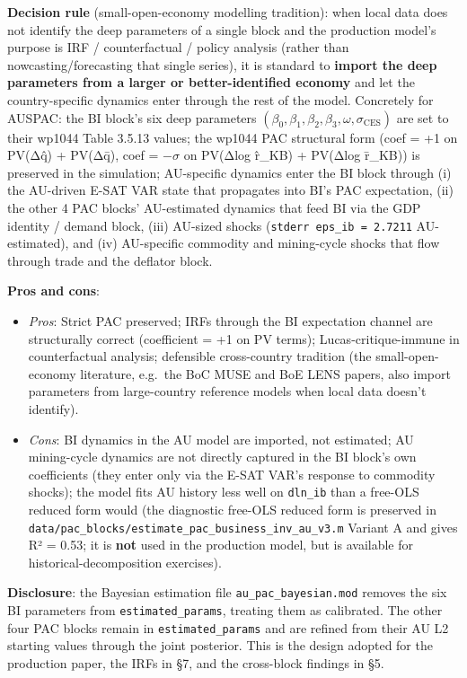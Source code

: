 \documentclass[
]{article}
\providecommand{\tightlist}{%
  \setlength{\itemsep}{0pt}\setlength{\parskip}{0pt}}
\begin{document}
\textbf{Decision rule} (small-open-economy modelling tradition): when
local data does not identify the deep parameters of a single block and
the production model's purpose is IRF / counterfactual / policy analysis
(rather than nowcasting/forecasting that single series), it is standard
to \textbf{import the deep parameters from a larger or better-identified
economy} and let the country-specific dynamics enter through the rest of
the model. Concretely for AUSPAC: the BI block's six deep parameters
\((\beta_0, \beta_1, \beta_2, \beta_3, \omega, \sigma_{\mathrm{CES}})\)
are set to their wp1044 Table 3.5.13 values; the wp1044 PAC structural
form (coef = +1 on PV(Δq̂) + PV(Δq̄), coef = \(-\sigma\) on PV(Δlog r̂\_KB)
+ PV(Δlog r̄\_KB)) is preserved in the simulation; AU-specific dynamics
enter the BI block through (i) the AU-driven E-SAT VAR state that
propagates into BI's PAC expectation, (ii) the other 4 PAC blocks'
AU-estimated dynamics that feed BI via the GDP identity / demand block,
(iii) AU-sized shocks (\texttt{stderr\ eps\_ib\ =\ 2.7211}
AU-estimated), and (iv) AU-specific commodity and mining-cycle shocks
that flow through trade and the deflator block.

\textbf{Pros and cons}:

\begin{itemize}
\tightlist
\item
  \emph{Pros}: Strict PAC preserved; IRFs through the BI expectation
  channel are structurally correct (coefficient = +1 on PV terms);
  Lucas-critique-immune in counterfactual analysis; defensible
  cross-country tradition (the small-open-economy literature, e.g.~the
  BoC MUSE and BoE LENS papers, also import parameters from
  large-country reference models when local data doesn't identify).
\item
  \emph{Cons}: BI dynamics in the AU model are imported, not estimated;
  AU mining-cycle dynamics are not directly captured in the BI block's
  own coefficients (they enter only via the E-SAT VAR's response to
  commodity shocks); the model fits AU history less well on
  \texttt{dln\_ib} than a free-OLS reduced form would (the diagnostic
  free-OLS reduced form is preserved in
  \texttt{data/pac\_blocks/estimate\_pac\_business\_inv\_au\_v3.m}
  Variant A and gives R² = 0.53; it is \textbf{not} used in the
  production model, but is available for historical-decomposition
  exercises).
\end{itemize}

\textbf{Disclosure}: the Bayesian estimation file
\texttt{au\_pac\_bayesian.mod} removes the six BI parameters from
\texttt{estimated\_params}, treating them as calibrated. The other four
PAC blocks remain in \texttt{estimated\_params} and are refined from
their AU L2 starting values through the joint posterior. This is the
design adopted for the production paper, the IRFs in §7, and the
cross-block findings in §5.
\end{document}
